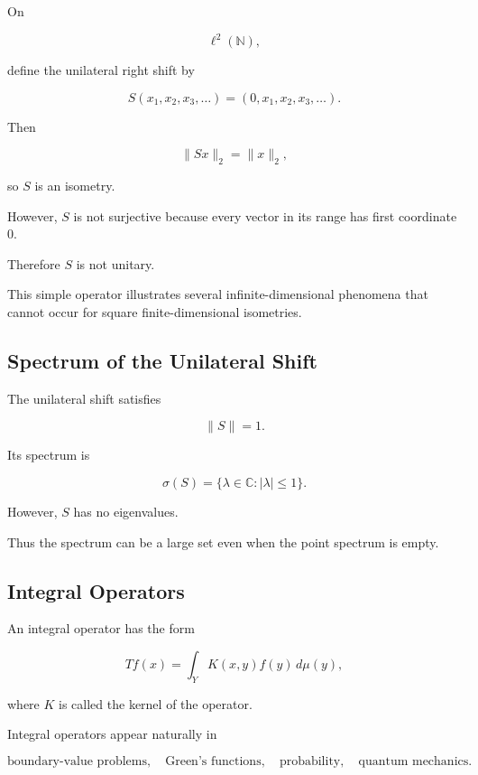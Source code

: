 On

\[
\ell^2(\mathbb{N}),
\]

define the unilateral right shift by

\[
\boxed{
S(x_1,x_2,x_3,\ldots)
=
(0,x_1,x_2,x_3,\ldots).
}
\]

Then

\[
\boxed{
\|Sx\|_2=\|x\|_2,
}
\]

so \(S\) is an isometry.

However, \(S\) is not surjective because every vector in its range has
first coordinate \(0\).

Therefore \(S\) is not unitary.

This simple operator illustrates several infinite-dimensional phenomena
that cannot occur for square finite-dimensional isometries.

\subsection{Spectrum of the Unilateral Shift}
\label{subsec:spectrum-unilateral-shift}

The unilateral shift satisfies

\[
\boxed{
\|S\|=1.
}
\]

Its spectrum is

\[
\boxed{
\sigma(S)
=
\{
\lambda\in\mathbb{C}:|\lambda|\leq1
\}.
}
\]

However, \(S\) has no eigenvalues.

Thus the spectrum can be a large set even when the point spectrum is
empty.

\subsection{Integral Operators}
\label{subsec:integral-operators}

An integral operator has the form

\[
\boxed{
Tf(x)
=
\int_Y
K(x,y)f(y)\,d\mu(y),
}
\]

where \(K\) is called the kernel of the operator.

Integral operators appear naturally in

\[
\boxed{
\text{boundary-value problems},
\quad
\text{Green's functions},
\quad
\text{probability},
\quad
\text{quantum mechanics}.
}
\]

